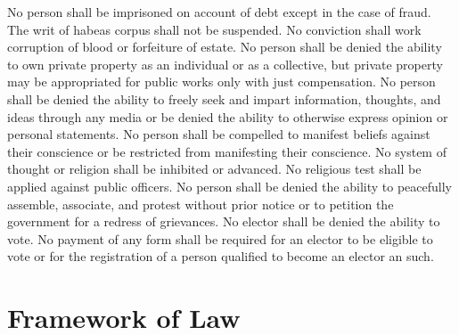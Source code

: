 \documentclass{article}
\begin{document}
No person shall be imprisoned on account of debt except in the case of fraud.
The writ of habeas corpus shall not be suspended. No conviction shall work corruption of blood or forfeiture of estate.
No person shall be denied the ability to own private property as an individual or as a collective, but private property may be appropriated for public works only with just compensation.
No person shall be denied the ability to freely seek and impart information, thoughts, and ideas through any media or be denied the ability to otherwise express opinion or personal statements. 
No person shall be compelled to manifest beliefs against their conscience or be restricted from manifesting their conscience. 
No system of thought or religion shall be inhibited or advanced. No religious test shall be applied against public officers.
No person shall be denied the ability to peacefully assemble, associate, and protest without prior notice or to petition the government for a redress of grievances.
No elector shall be denied the ability to vote. No payment of any form shall be required for an elector to be eligible to vote or for the registration of a person qualified to become an elector an such.
\section{Framework of Law}
\end{document}
